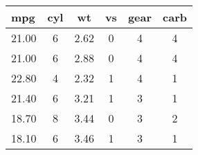 \begin{tabular}{lccccc}
\hline
\textbf{mpg} & \textbf{cyl} & \textbf{wt} & \textbf{vs} & \textbf{gear} & \textbf{carb} \\
\hline
21.00 & 6 & 2.62 & 0 & 4 & 4\\
21.00 & 6 & 2.88 & 0 & 4 & 4\\
22.80 & 4 & 2.32 & 1 & 4 & 1\\
21.40 & 6 & 3.21 & 1 & 3 & 1\\
18.70 & 8 & 3.44 & 0 & 3 & 2\\
18.10 & 6 & 3.46 & 1 & 3 & 1\\
\hline
\end{tabular}
